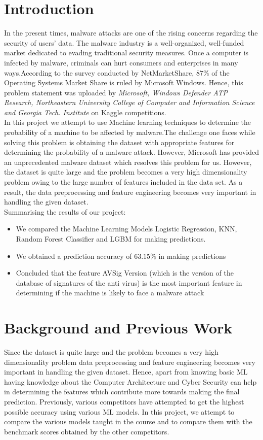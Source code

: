 \documentclass[conference]{IEEEtran}
\begin{document}
\section{Introduction}
In the present times, malware attacks are one of the rising concerns regarding the security of users' data. The malware industry is a well-organized, well-funded market dedicated to evading traditional security measures. Once a computer is infected by malware, criminals can hurt consumers and enterprises in many ways.According to the survey conducted by NetMarketShare, $87\%$ of the Operating Systems Market Share is ruled by Microsoft Windows. Hence, this problem statement was uploaded by \textit{Microsoft, Windows Defender ATP Research, Northeastern University College of Computer and Information Science and Georgia Tech. Institute} on Kaggle competitions.\\
In this project we attempt to use Machine learning techniques to determine the probability of a machine to be affected by malware.The challenge one faces while solving this problem is obtaining the dataset with appropriate features for determining the probability of a malware attack. However, Microsoft has provided an unprecedented malware dataset which resolves this problem for us. However, the dataset is quite large and the problem becomes a very high dimensionality problem owing to the large number of features included in the data set. As a result, the data preprocessing and feature engineering becomes very important in handling the given dataset.\\
Summarising the results of our project:
\begin{itemize}
    \item We compared the Machine Learning Models Logistic Regression, KNN, Random Forest Classifier and LGBM for making predictions.
    \item We obtained a prediction accuracy of $63.15 \%$ in making predictions
    \item Concluded that the feature AVSig Version (which is the version of the database of signatures of the anti virus) is the most important feature in determining if the machine is likely to face a malware attack
\end{itemize}

\section{Background and Previous Work}
Since the dataset is quite large and the problem becomes a very high dimensionality problem data preprocessing and feature engineering becomes very important in handling the given dataset. Hence, apart from knowing basic ML having knowledge about the Computer Architecture and Cyber Security can help in determining the features which contribute more towards making the final prediction. Previously, various competitors have attempted  to get the highest possible accuracy using various ML models. In this project, we attempt to compare the various models taught in the course and to compare them with the benchmark scores obtained by the other competitors.
\end{document}

